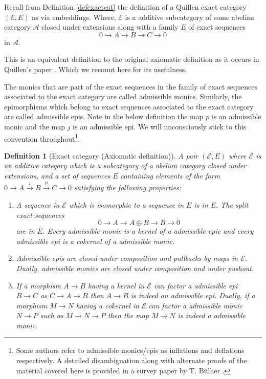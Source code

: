\documentclass[12pt]{report}
\numberwithin{equation}{section}
\newtheorem{definition}[dummy]{Definition}
\begin{document}
	Recall from Definition \ref{defexactcat} the definition of a Quillen exact category $(\mathcal{E}, E)$ as via embeddings. Where, $\mathcal{E}$ is a additive subcategory of some abelian category $\mathcal{A}$ closed under extensions along with a family $E$ of exact sequences \[ 0 \to A \to B \rightarrow C \to 0 \] in $\mathcal{A}$. 
		
	This is an equivalent definition to the original axiomatic definition as it occurs in Quillen's paper \cite{quillenhigherktheoryI}. Which we recount here for its usefulness.
		
		The monics that are part of the exact sequences in the family of exact sequences associated to the exact category are called admissible monics. Similarly, the epimorphisms which belong to exact sequences associated to the exact category are called admissible epis. Note in the below definition the map \(p\) is an admissible monic and the map \(j\) is an admissible epi. We will unconsciously stick to this convention throughout\footnote{Some authors refer to admissible monics/epis as inflations and deflations respectively. A detailed disambiguation along with alternate proofs of the material covered here is provided in a survey paper by T. B{\"u}lher \cite{BUHLER20101}. }.
		
		
		\begin{definition}[Exact category (Axiomatic definition)]
			A pair $(\mathcal{E},E)$ where $\mathcal{E}$ is an additive category which is a subcategory of a abelian category closed under extensions, and a set of sequences $E$ containing elements of the form $0 \to A \xrightarrow{i} B \xrightarrow{p} C \to 0$ satisfying the following properties:
			\begin{enumerate}[label=(E\arabic*)]
				\item A sequence in \(\mathcal{E}\) which is isomorphic to a sequence in \(E\) is in \(E\). The split exact sequences \[0 \to A \to A \oplus B \to B \to 0\] are in \(E\). Every admissible monic is a kernel of a admissible epic and every admissible epi is a cokernel of a admissible monic.
				\item Admissible epis are closed under composition 
				and pullbacks by maps in \(\mathcal{E}\). Dually, admissible monics are closed under composition and under pushout.
				\item If a morphism \(A \to B \) having a kernel in \(\mathcal{E}\) can factor a admissible epi \(B \to C\) as \(C \to A \to B\) then \(A\to B\) is indeed an admissible epi. Dually, if a morphism \(M \to N\) having a cokernel in \(\mathcal{E}\) can factor a admissible monic \(N \to P\) such as \(M \to N \to P\) then the map \(M \to N\) is indeed a admissible monic.
			\end{enumerate}
		
		\end{definition}
		
\end{document}
